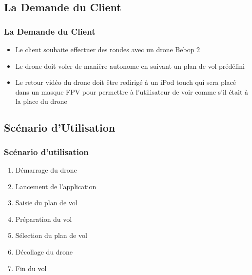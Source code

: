 \documentclass{beamer}
\begin{document}
	\begin{frame}
		\section{La Demande du Client}
		\begin{center}
		\frametitle{La Demande du Client}
		\begin{itemize}
		    \item Le client souhaite effectuer des rondes avec un drone Bebop 2\\
		    \item Le drone doit voler de manière autonome en suivant un plan de vol prédéfini \\
		    \item Le retour vidéo du drone doit être redirigé à un iPod touch qui sera placé dans un masque FPV pour permettre à l'utilisateur de voir comme s'il était à la place du drone\\
		\end{itemize}
		   
		\end{center}
	\end{frame}
	\begin{frame}
		\section{Scénario d'Utilisation}
		\begin{center}
		\frametitle{Scénario d'utilisation}
		\begin{enumerate}
		    \item Démarrage du drone\\
		    \item Lancement de l'application \\
		    \item Saisie du plan de vol 
		    \item Préparation du vol
		    \item Sélection du plan de vol
		    \item Décollage du drone
		    \item Fin du vol
		\end{enumerate}
		   
		\end{center}
	\end{frame}
	
\end{document}
